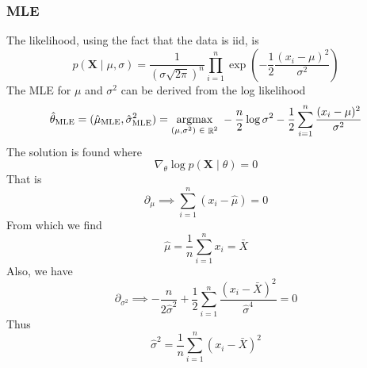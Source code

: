 \documentclass{article}
\DeclareMathOperator{\R}{\mathbb{R}}
\newcommand{\s}{\hspace{0.1cm}}
\numberwithin{equation}{section}
\newcommand{\mle}[1]{\hat{#1}_{\text{MLE}}}
\begin{document}
\subsubsection{MLE}
The likelihood, using the fact that the data is iid, is
\[
        p(\mathbf{X} \mid \mu,\sigma) = \frac{1}{ (\sigma \sqrt{2\pi})^n} 
        \prod_{i = 1}^n 
        \exp\left( -\frac{1}{2}\frac{(x_i - \mu)^2}{\sigma^2} \right) 

\]
The MLE for $\mu$ and $\sigma^2$ can be derived from the log likelihood
 \[
         \mle{\theta} = (\mle{\mu}, \mle{\sigma}^2) = 
         \underset{ (\mu, \sigma^2) \s \in \s \R^2}{\text{argmax}} 
                 \s
                 -\frac{n}{2} \log \sigma^2
                 -\frac{1}{2}\sum_{i = 1}^n \frac{(x_i - \mu)^2}{\sigma^2}
\]
The solution is found where
\[
        \nabla_\theta \log p(\mathbf{X} \mid \theta) = 0
\]
That is
\[
        \partial_\mu \implies  \sum_{i = 1}^n (x_i - \hat{\mu}) = 0
\]
From which we find
\[
        \hat{\mu} = \frac{1}{n}\sum_{i = 1}^n x_i = \bar{X}
\]
Also, we have
\[
        \partial_{\sigma^2} \implies -\frac{n}{2\hat{\sigma}^2} + 
        \frac{1}{2}\sum_{i =1}^n \frac{(x_i - \bar{X})^2}{\hat{\sigma}^4} = 0
\]
Thus
\[
        \hat{\sigma}^2 = \frac{1}{n}\sum_{i = 1}^n (x_i - \bar{X})^2 
\]
\end{document}
